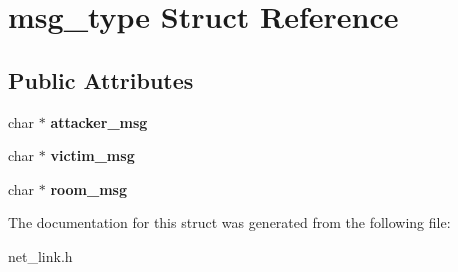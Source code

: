 \hypertarget{structmsg__type}{\section{msg\-\_\-type Struct Reference}
\label{structmsg__type}
}
\subsection*{Public Attributes}
\begin{DoxyCompactItemize}
\item 
\hypertarget{structmsg__type_ae3e0e3f99fc89b890a07fbbe55faca50}{char $\ast$ {\bfseries attacker\-\_\-msg}}\label{structmsg__type_ae3e0e3f99fc89b890a07fbbe55faca50}

\item 
\hypertarget{structmsg__type_ae9a7bafabfd4e3db88146aa2c6113f1e}{char $\ast$ {\bfseries victim\-\_\-msg}}\label{structmsg__type_ae9a7bafabfd4e3db88146aa2c6113f1e}

\item 
\hypertarget{structmsg__type_a766cdea233f2b1d252ca40bd2a459c7a}{char $\ast$ {\bfseries room\-\_\-msg}}\label{structmsg__type_a766cdea233f2b1d252ca40bd2a459c7a}

\end{DoxyCompactItemize}


The documentation for this struct was generated from the following file\-:\begin{DoxyCompactItemize}
\item 
net\-\_\-link.\-h\end{DoxyCompactItemize}
